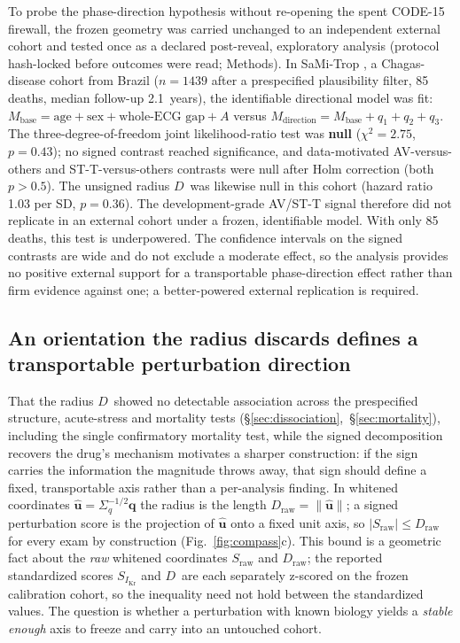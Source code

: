 \documentclass[11pt]{article}
\newcommand{\D}{\ensuremath{D}}
\newcommand{\A}{\ensuremath{A}}
\begin{document}
To probe the phase-direction hypothesis without re-opening the spent CODE-15 firewall, the
frozen geometry was carried unchanged to an independent external cohort and tested once as a
declared post-reveal, exploratory analysis (protocol hash-locked before outcomes were read;
Methods). In SaMi-Trop \citep{cardoso2016samitrop,samitrop2021data}, a Chagas-disease cohort from
Brazil ($n=\num{1439}$ after a prespecified plausibility filter, \num{85} deaths, median
follow-up \num{2.1}~years), the
identifiable directional model was fit: $M_{\text{base}}=\text{age}+\text{sex}+\text{whole-ECG
gap}+\A$ versus $M_{\text{direction}}=M_{\text{base}}+q_1+q_2+q_3$. The three-degree-of-freedom
joint likelihood-ratio test was \textbf{null} ($\chi^2=\num{2.75}$, $p=\num{0.43}$); no signed
contrast reached significance, and data-motivated AV-versus-others and ST-T-versus-others
contrasts were null after Holm correction (both $p>\num{0.5}$). The unsigned radius \D\ was
likewise null in this cohort (hazard ratio \num{1.03} per SD, $p=\num{0.36}$). The
development-grade AV/ST-T signal therefore did not replicate in an external cohort under a
frozen, identifiable model. With only \num{85} deaths, this test is underpowered. The
confidence intervals on the signed contrasts are wide and do not exclude a moderate
effect, so the analysis provides no positive external support for a transportable phase-direction
effect rather than firm evidence against one; a better-powered external replication is
required.

\subsection{An orientation the radius discards defines a transportable perturbation direction}
\label{sec:transport}

That the radius \D\ showed no detectable association across the prespecified
structure, acute-stress and mortality tests
(\S\ref{sec:dissociation},~\S\ref{sec:mortality}), including the single
confirmatory mortality test, while the signed
decomposition recovers the drug's mechanism motivates a sharper construction: if the sign
carries the information the magnitude throws away, that sign should define a fixed,
transportable axis rather than a per-analysis finding. In whitened coordinates
$\hat{\mathbf{u}}=\Sigma_q^{-1/2}\mathbf{q}$ the radius is the length
$\D_{\text{raw}}=\lVert\hat{\mathbf{u}}\rVert$; a signed perturbation score is the
projection of $\hat{\mathbf{u}}$ onto a fixed unit axis, so $|S_{\text{raw}}|\le\D_{\text{raw}}$
for every exam by construction (Fig.~\ref{fig:compass}c). This bound is a geometric fact about
the \emph{raw} whitened coordinates $S_{\text{raw}}$ and $\D_{\text{raw}}$; the reported
standardized scores $S_{I_{\text{Kr}}}$ and \D\ are each separately z-scored on the frozen
calibration cohort, so the inequality need not hold between the standardized values. The question is whether a perturbation with known biology
yields a \emph{stable enough} axis to freeze and carry into an untouched cohort.
\end{document}
